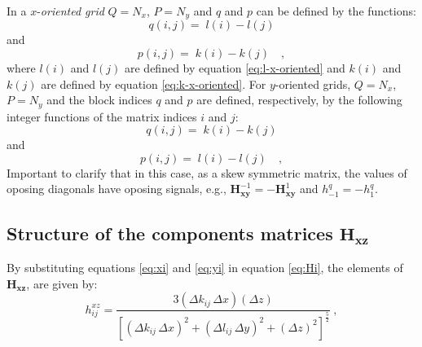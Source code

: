 In a $x$-\textit{oriented grid} $Q = N_{x}$, $P = N_{y}$ and $q$ and $p$ can be defined by the functions:
\begin{equation}
	q(i, j) = \; l(i) - l(j) 
	\label{eq:Hxy-q-x-oriented}
\end{equation}
and
\begin{equation}
	p(i, j) = \; k(i) - k(j) \quad ,
	\label{eq:Hxy-p-x-oriented}
\end{equation}
where $l(i)$ and $l(j)$ are defined by equation \ref{eq:l-x-oriented} 
and $k(i)$ and $k(j)$ are defined by equation \ref{eq:k-x-oriented}.
For $y$-oriented grids, $Q = N_{x}$, $P = N_{y}$ and the block indices
$q$ and $p$ are defined, respectively, by the following integer functions 
of the matrix indices $i$ and $j$:
\begin{equation}
	q(i, j) = \;  k(i) - k(j)  
	\label{eq:Hxy-q-y-oriented}
\end{equation}
and
\begin{equation}
	p(i, j) = \;  l(i) - l(j)  \quad ,
	\label{eq:Hxy-p-y-oriented}
\end{equation}
Important to clarify that in this case, as a skew symmetric matrix, the values of oposing diagonals have oposing signals, e.g., $\mathbf{H}^{-1}_\mathbf{xy} = -\mathbf{H}^{1}_\mathbf{xy}$ and $h^{q}_{-1} = -h^{q}_{1} $.

\subsection{Structure of the components matrices $\mathbf{H_{xz}}$}

By substituting equations \ref{eq:xi} and \ref{eq:yi} in equation \ref{eq:Hi}, the elements of $\mathbf{H_{xz}}$, are given by:
\begin{equation}
	h^{xz}_{ij} = \frac{3 (\Delta k_{ij} \, \Delta x)(\Delta z)}{\left[ 
		\left( \Delta k_{ij} \, \Delta x \right)^{2} + 
		\left( \Delta l_{ij} \, \Delta y \right)^{2} + 
		\left( \Delta z \right)^{2} \right]^{\frac{5}{2}}} \: ,
	\label{eq:hxz_mag}
\end{equation}

